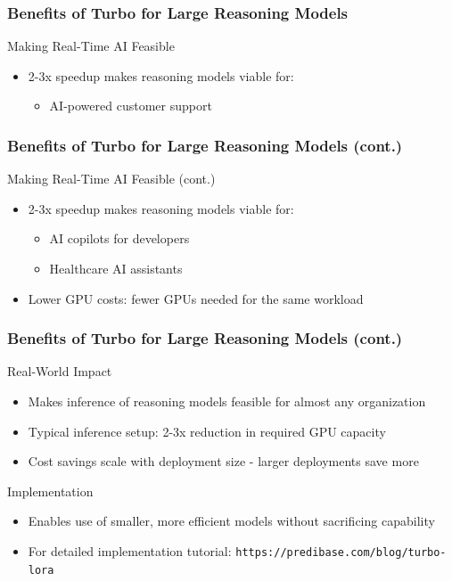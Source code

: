 \documentclass[aspectratio=169]{beamer}
\begin{document}
\begin{frame}
	\frametitle{Benefits of Turbo for Large Reasoning Models}
	\begin{block}{Making Real-Time AI Feasible}
		\begin{itemize}
			\item 2-3x speedup makes reasoning models viable for:
			\begin{itemize}
				\item AI-powered customer support
			\end{itemize}
		\end{itemize}
	\end{block}
\end{frame}

\begin{frame}
	\frametitle{Benefits of Turbo for Large Reasoning Models (cont.)}
	\begin{block}{Making Real-Time AI Feasible (cont.)}
		\begin{itemize}
			\item 2-3x speedup makes reasoning models viable for:
			\begin{itemize}
				\item AI copilots for developers
				\item Healthcare AI assistants
			\end{itemize}
			\item Lower GPU costs: fewer GPUs needed for the same workload
		\end{itemize}
	\end{block}
\end{frame}

\begin{frame}
	\frametitle{Benefits of Turbo for Large Reasoning Models (cont.)}
	\begin{block}{Real-World Impact}
		\begin{itemize}
			\item Makes inference of reasoning models feasible for almost any organization
			\item Typical inference setup: 2-3x reduction in required GPU capacity
			\item Cost savings scale with deployment size - larger deployments save more
		\end{itemize}
	\end{block}
	\begin{block}{Implementation}
		\begin{itemize}
			\item Enables use of smaller, more efficient models without sacrificing capability
			\item For detailed implementation tutorial: \texttt{https://predibase.com/blog/turbo-lora}
		\end{itemize}
	\end{block}
\end{frame}
\end{document}
